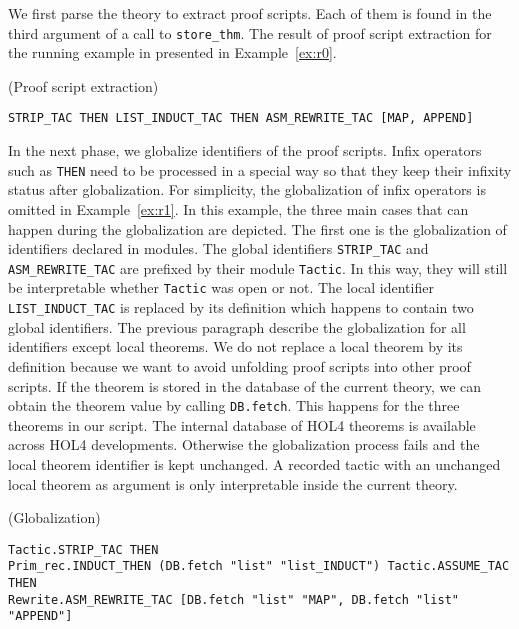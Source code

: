 \documentclass[runningheads,a4paper,draft]{svjour3}
\def\holfour{\textsf{HOL4}\xspace}
\begin{document}
We first parse the theory to extract proof scripts. Each of them is found in
the third argument of a call to \texttt{store\_thm}. The result of proof script
extraction for the running example in presented in Example~\ref{ex:r0}.

\begin{example}\label{ex:r0}(Proof script extraction)
\small
\begin{lstlisting}[language=SMLSmall]
STRIP_TAC THEN LIST_INDUCT_TAC THEN ASM_REWRITE_TAC [MAP, APPEND]
\end{lstlisting}
\end{example}

In the next phase, we globalize identifiers of the proof scripts.
Infix operators such as \texttt{THEN} need to be processed in a special way so
that they keep their infixity status after globalization. For simplicity,
the
globalization of infix operators is omitted in Example~\ref{ex:r1}.
In this example, the three main cases that can happen during the globalization
are depicted. The first one is the globalization of identifiers declared in
modules. The global identifiers \texttt{STRIP\_TAC} and
\texttt{ASM\_REWRITE\_TAC} are prefixed by their module \texttt{Tactic}. In
this way, they will still be interpretable whether \texttt{Tactic} was open or
not. The local identifier \texttt{LIST\_INDUCT\_TAC} is replaced by its
definition which happens to contain two global identifiers.
The previous paragraph describe the globalization for all identifiers except
local theorems.  We do not replace a local
theorem by its definition because we want to avoid unfolding proof scripts into
other proof scripts.
If the theorem is stored in the database of the current theory, we
can obtain the theorem value by calling \texttt{DB.fetch}. This happens for the
three theorems in our script. The internal database of \holfour theorems is
available across \holfour developments.
Otherwise the globalization process fails and the local theorem identifier is
kept unchanged. A recorded tactic with an unchanged local theorem as argument
is only interpretable inside the current theory.

\begin{example}\label{ex:r1} (Globalization)
\begin{lstlisting}[language=SMLSmall]
Tactic.STRIP_TAC THEN
Prim_rec.INDUCT_THEN (DB.fetch "list" "list_INDUCT") Tactic.ASSUME_TAC THEN
Rewrite.ASM_REWRITE_TAC [DB.fetch "list" "MAP", DB.fetch "list" "APPEND"]
\end{lstlisting}
\end{example}
\end{document}

